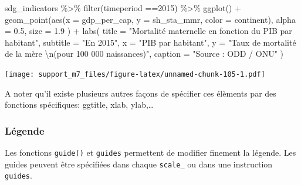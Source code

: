 \documentclass[
]{book}
\newenvironment{Shaded}{\begin{snugshade}}{\end{snugshade}}
\newcommand{\AttributeTok}[1]{\textcolor[rgb]{0.77,0.63,0.00}{#1}}
\newcommand{\DecValTok}[1]{\textcolor[rgb]{0.00,0.00,0.81}{#1}}
\newcommand{\FloatTok}[1]{\textcolor[rgb]{0.00,0.00,0.81}{#1}}
\newcommand{\FunctionTok}[1]{\textcolor[rgb]{0.00,0.00,0.00}{#1}}
\newcommand{\NormalTok}[1]{#1}
\newcommand{\SpecialCharTok}[1]{\textcolor[rgb]{0.00,0.00,0.00}{#1}}
\newcommand{\StringTok}[1]{\textcolor[rgb]{0.31,0.60,0.02}{#1}}
\begin{document}
\begin{Shaded}
\begin{Highlighting}[]
\NormalTok{sdg\_indicators }\SpecialCharTok{\%\textgreater{}\%} 
  \FunctionTok{filter}\NormalTok{(timeperiod }\SpecialCharTok{==}\DecValTok{2015}\NormalTok{) }\SpecialCharTok{\%\textgreater{}\%} 
  \FunctionTok{ggplot}\NormalTok{() }\SpecialCharTok{+}
  \FunctionTok{geom\_point}\NormalTok{(}\FunctionTok{aes}\NormalTok{(}\AttributeTok{x =}\NormalTok{ gdp\_per\_cap, }
                 \AttributeTok{y =}\NormalTok{ sh\_sta\_mmr,}
                 \AttributeTok{color =}\NormalTok{ continent),}
    \AttributeTok{alpha =} \FloatTok{0.5}\NormalTok{, }
    \AttributeTok{size =} \FloatTok{1.9}
\NormalTok{  ) }\SpecialCharTok{+}
  \FunctionTok{labs}\NormalTok{(}
    \AttributeTok{title =} \StringTok{"Mortalité maternelle en fonction du PIB par habitant"}\NormalTok{,}
    \AttributeTok{subtitle =} \StringTok{"En 2015"}\NormalTok{,}
    \AttributeTok{x =} \StringTok{"PIB par habitant"}\NormalTok{,}
    \AttributeTok{y =} \StringTok{"Taux de mortalité de la mère }\SpecialCharTok{\textbackslash{}n}\StringTok{(pour 100 000 naissances)"}\NormalTok{,}
    \AttributeTok{caption =} \StringTok{"Source : ODD / ONU"}
\NormalTok{  )}
\end{Highlighting}
\end{Shaded}

\texttt{[image: support\_m7\_files/figure-latex/unnamed-chunk-105-1.pdf]}

A noter qu'il existe plusieurs autres façons de spécifier ces élèments par des fonctions spécifiques: ggtitle, xlab, ylab,\ldots{}

\hypertarget{luxe9gende}{%
\subsubsection{Légende}\label{luxe9gende}}

Les fonctions \texttt{guide()} et \texttt{guides} permettent de modifier finement la légende.
Les guides peuvent être spécifiées dans chaque \texttt{scale\_} ou dans une instruction \texttt{guides}.
\end{document}
